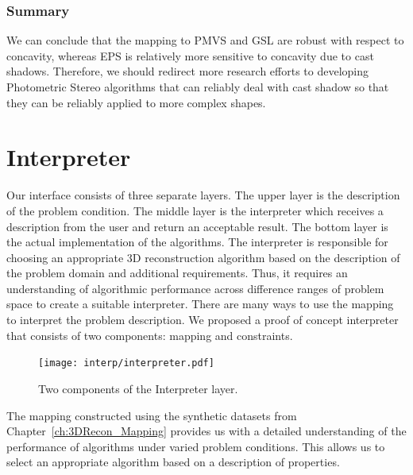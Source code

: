 \subsubsection{Summary}
We can conclude that the mapping to PMVS and GSL are robust with respect to concavity, whereas EPS is relatively more sensitive to concavity due to cast shadows. Therefore, we should redirect more research efforts to developing Photometric Stereo algorithms that can reliably deal with cast shadow so that they can be reliably applied to more complex shapes.


\section{Interpreter}
\label{sec:interp}
Our interface consists of three separate layers. The upper layer is the description of the problem condition. The middle layer is the interpreter which receives a description from the user and return an acceptable result. The bottom layer is the actual implementation of the algorithms. The interpreter is responsible for choosing an appropriate 3D reconstruction algorithm based on the description of the problem domain and additional requirements. Thus, it requires an understanding of algorithmic performance across difference ranges of problem space to create a suitable interpreter. There are many ways to use the mapping to interpret the problem description. We proposed a proof of concept interpreter that consists of two components: mapping and constraints.
\begin{figure}[!htbp]
\centering
\texttt{[image: interp/interpreter.pdf]}
\caption{Two components of the Interpreter layer.}
\label{fig:interpreter_layer}
\end{figure}

The mapping constructed using the synthetic datasets from Chapter~\ref{ch:3DRecon_Mapping} provides us with a detailed understanding of the performance of algorithms under varied problem conditions. This allows us to select an appropriate algorithm based on a description of properties.


